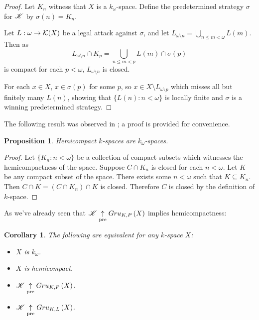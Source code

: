\documentclass{amsart}
\newtheorem{proposition}[theorem]{Proposition}
\newtheorem{corollary}[theorem]{Corollary}
\theoremstyle{definition}
\begin{document}
\begin{proof}
  Let \(K_n\) witness that \(X\) is a \(k_\omega\)-space. Define the predetermined
  strategy \(\sigma\) for \(\mathscr{K}\) by \(\sigma(n)=K_n\).

  Let \(L:\omega\to\mathcal{K}(X)\) be a legal attack against \(\sigma\), and let
  \(L_{\omega\setminus n} = \bigcup_{n\leq m<\omega}L(m)\). Then as
    \[
      L_{\omega\setminus n}\cap K_p
        =
      \bigcup_{n\leq m< p}L(m) \cap \sigma(p)
    \]
  is compact for each \(p<\omega\), \(L_{\omega\setminus n}\) is closed.

  For each \(x\in X\), \(x\in \sigma(p)\) for some \(p\), so
  \(x\in X\setminus L_{\omega\setminus p}\) which misses all but finitely
  many \(L(n)\), showing that \(\{L(n):n<\omega\}\) is locally finite and
  \(\sigma\) is a winning predetermined strategy.
\end{proof}

The following result was observed in \cite{MR540599}; a proof is provided
for convenience.

\begin{proposition}
  Hemicompact \(k\)-spaces are \(k_\omega\)-spaces.
\end{proposition}

\begin{proof}
  Let \(\{K_n:n<\omega\}\) be a collection of compact subsets
  which witnesses the hemicompactness of the space.
  Suppose \(C\cap K_n\) is closed for each \(n<\omega\).
  Let \(K\) be any compact subset of the space.
  There exists some \(n<\omega\) such that \(K\subseteq K_n\).
  Then \(C\cap K=(C\cap K_n)\cap K\) is closed. Therefore \(C\)
  is closed by the definition of \(k\)-space.
\end{proof}

As we've already seen that \(\mathscr{K} \underset{\text{pre}}{\uparrow} Gru_{K,P}\left({X}\right)\) implies
hemicompactness:

\begin{corollary}
  The following are equivalent for any \(k\)-space \(X\):
    \begin{itemize}
      \item \(X\) is \(k_{\omega}\).
      \item \(X\) is hemicompact.
      \item \(\mathscr{K} \underset{\text{pre}}{\uparrow} Gru_{K,P}\left({X}\right)\).
      \item \(\mathscr{K} \underset{\text{pre}}{\uparrow} Gru_{K,L}\left({X}\right)\).
    \end{itemize}
\end{corollary}
\end{document}
